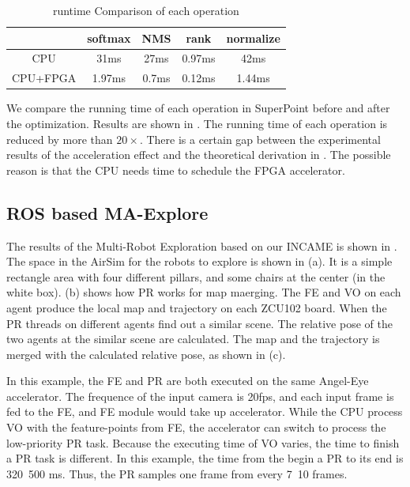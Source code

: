 \begin{table}[t]
  \centering
  \caption{runtime Comparison of each operation}
\begin{tabular}{|c|c|c|c|c|}
  \hline
             &    softmax &        NMS &       rank &  normalize \bigstrut\\
  \hline
         CPU &       31ms &       27ms &       0.97ms &       42ms \bigstrut\\
  \hline
    CPU+FPGA &     1.97ms &      0.7ms &     0.12ms &     1.44ms \bigstrut\\
  \hline
  \end{tabular}  
  
  \label{tab:optimization}%
\end{table}%

We compare the running time of each operation in SuperPoint before and after the optimization. Results are shown in . The running time of each operation is reduced by more than $20\times$. There is a certain gap between the experimental results of the acceleration effect and the theoretical derivation in . The possible reason is that the CPU needs time to schedule the FPGA accelerator.

\subsection{ ROS based MA-Explore }

The results of the Multi-Robot Exploration based on our INCAME is shown in . The space in the AirSim for the robots to explore is shown in (a). It is a simple rectangle area with four different pillars, and some chairs at the center (in the white box).  (b) shows how PR works for map maerging. The FE and VO on each agent produce the local map and trajectory on each ZCU102 board. When the PR threads on different agents find out a similar scene. The relative pose of the two agents at the similar scene are calculated. The map and the trajectory is merged with the calculated relative pose, as shown in (c).

In this example, the FE and PR are both executed on the same Angel-Eye accelerator. The frequence of the input camera is 20fps, and each input frame is fed to the FE, and FE module would take up accelerator. While the CPU process VO with the feature-points from FE, the accelerator can switch to process the low-priority PR task. Because the executing time of VO varies, the time to finish a PR task is different. In this example, the time from the begin a PR to its end is 320~500 ms. Thus, the PR samples one frame from every 7~10 frames.